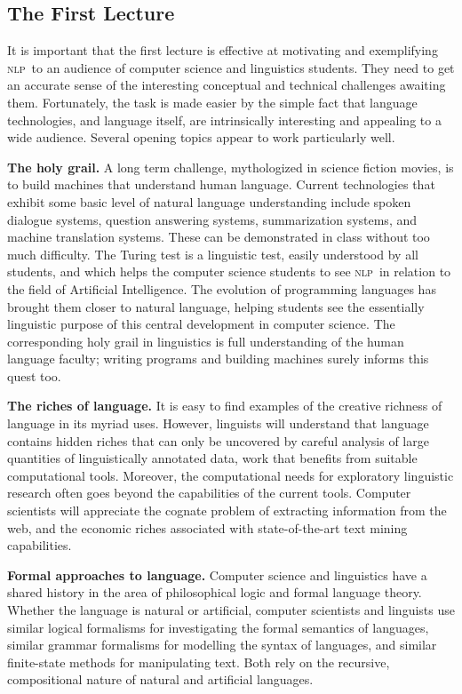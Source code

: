 \documentclass[11pt]{article}
\newcommand{\NLP}{\textsc{nlp}}
\begin{document}
\subsection{The First Lecture}

It is important that the first lecture is effective at motivating and
exemplifying \NLP\ to an audience of computer science and linguistics
students.  They need to get an accurate sense of the interesting
conceptual and technical challenges awaiting them.  Fortunately, the
task is made easier by the simple fact that language technologies, and
language itself, are intrinsically interesting and appealing to a wide audience.
Several opening topics appear to work particularly well.

\textbf{The holy grail.}
A long term challenge, mythologized in science fiction movies, is to
build machines that understand human language.  Current technologies
that exhibit some basic level of natural language understanding include
spoken dialogue systems, question answering systems, summarization
systems, and machine translation systems.  These can be demonstrated
in class without too much difficulty.  The Turing test is a linguistic
test, easily understood by all students, and which helps the computer science
students to see \NLP\ in relation to the field of Artificial Intelligence.
The evolution of programming languages has brought them closer to natural language,
helping students see the essentially linguistic purpose of this central development
in computer science.  The corresponding holy grail in linguistics is full
understanding of the human language faculty; writing programs and building machines
surely informs this quest too.

\textbf{The riches of language.}
It is easy to find examples of the creative richness of language in
its myriad uses.  However, linguists will understand that language
contains hidden riches that can only be uncovered by careful analysis
of large quantities of linguistically annotated data, work that
benefits from suitable computational tools.  Moreover, the
computational needs for exploratory linguistic research often goes
beyond the capabilities of the current tools.  Computer scientists
will appreciate the cognate problem of extracting information from the
web, and the economic riches associated with state-of-the-art text
mining capabilities.

\textbf{Formal approaches to language.}
Computer science and linguistics have a shared history in the area of
philosophical logic and formal language theory.  Whether the language
is natural or artificial, computer scientists and linguists use
similar logical formalisms for investigating the formal semantics of
languages, similar grammar formalisms for modelling the syntax of
languages, and similar finite-state methods for manipulating text.
Both rely on the recursive, compositional nature of natural and
artificial languages.
\end{document}
